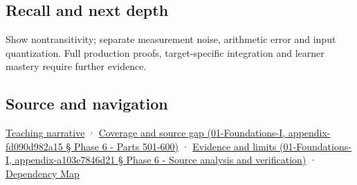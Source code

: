 \subsection{Recall and next depth}\label{recall-and-next-depth}

Show nontransitivity; separate measurement noise, arithmetic error and input quantization. Full production proofs, target-specific integration and learner mastery require further evidence.

\subsection{Source and navigation}\label{source-and-navigation}

\href{Continuous\%20Notes/Computing\%20Foundations\%20-\%20From\%20Bits\%20to\%20C++\%20and\%20Systems\%20APIs\#Reliability\%20begins\%20at\%20the\%20boundary\%20of\%20the\%20calculation}{Teaching narrative} · \href{}{Coverage and source gap (01-Foundations-I, appendix-fd090d982a15 § Phase 6 - Parts 501-600)} · \href{}{Evidence and limits (01-Foundations-I, appendix-a103e7846d21 § Phase 6 - Source analysis and verification)} · \hyperref[appendix-4ad47bdd269a]{Dependency Map}
